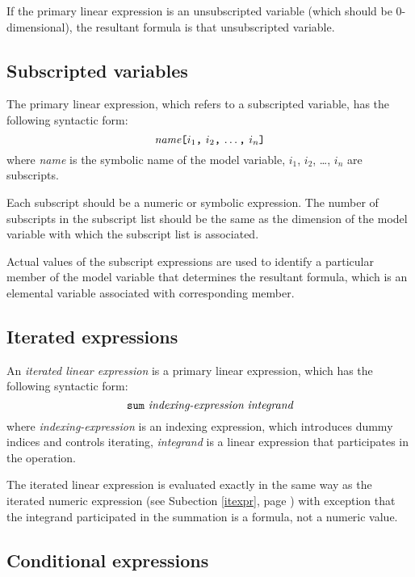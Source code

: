 \documentclass[11pt]{report}
\begin{document}
If the primary linear expression is an unsubscripted variable (which
should be 0-dimensional), the resultant formula is that unsubscripted
variable.

\vspace*{-5pt}

\subsection{Subscripted variables}

The primary linear expression, which refers to a subscripted variable,
has the following syntactic form:
$$\mbox{{\it name}{\tt[}$i_1${\tt,} $i_2${\tt,} \dots{\tt,}
$i_n${\tt]}}$$
where {\it name} is the symbolic name of the model variable, $i_1$,
$i_2$, \dots, $i_n$ are subscripts.

Each subscript should be a numeric or symbolic expression. The number
of subscripts in the subscript list should be the same as the dimension
of the model variable with which the subscript list is associated.

Actual values of the subscript expressions are used to identify a
particular member of the model variable that determines the resultant
formula, which is an elemental variable associated with corresponding
member.

\vspace*{-5pt}

\subsection{Iterated expressions}

An {\it iterated linear expression} is a primary linear expression,
which has the following syntactic form:
$$\mbox{{\tt sum} {\it indexing-expression} {\it integrand}}$$
where {\it indexing-expression} is an indexing expression, which
introduces dummy indices and controls iterating, {\it integrand} is
a linear expression that participates in the operation.

The iterated linear expression is evaluated exactly in the same way as
the iterated numeric expression (see Subection \ref{itexpr}, page
\pageref{itexpr}) with exception that the integrand participated in the
summation is a formula, not a numeric value.

\vspace*{-5pt}

\subsection{Conditional expressions}
\end{document}
